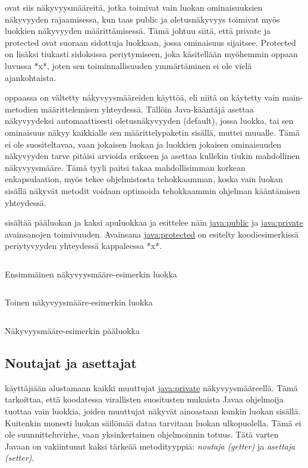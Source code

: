 \documentclass{tufte-book}
\newcommand{\eng}[1]{\textit{(#1)}}
\newcommand{\new}[1]{\textit{\gls{#1}}}
\newcommand{\neweng}[2]{\new{#1} \eng{#2}}
\newcommand{\java}[1]{\underline{\gls{java:#1}}}
\newcommand{\code}[3]{
\begin{listing}
    \inputminted{java}{OhjelmointiopasEsimerkit/src/#1/#2.java}
    \caption{#3}
    \label{Java-#1-#2}
\end{listing}
}
\begin{document}
 ovat siis näkyvyysmääreitä, jotka toimivat vain luokan
ominaisuuksien näkyvyyden rajaamisessa, kun taas public ja oletusnäkyvyys toimivat myös luokkien
näkyvyyden määrittämisessä. Tämä johtuu siitä, että private ja protected ovat suoraan sidottuja
luokkaan, jossa ominaisuus sijaitsee. Protected on lisäksi tiukasti sidoksissa periytymiseen, joka
käsitellään myöhemmin oppaan luvussa *x*, %
joten sen toiminnallisuuden ymmärtäminen ei ole vielä ajankohtaista.

 oppaassa on vältetty näkyvyysmääreiden käyttöä, eli niitä on käytetty
vain main-metodien määrittelemisen yhteydessä. Tällöin Java-kääntäjä asettaa näkyvyydeksi
automaattisesti oletusnäkyvyyden (default), jossa luokka, tai sen ominaisuus näkyy kaikkialle
sen määrittelypaketin sisällä, muttei muualle. Tämä ei ole suositeltavaa, vaan jokaisen luokan
ja luokkien jokaisen ominaisuuden näkyvyyden tarve pitäisi arvioida erikseen ja asettaa kullekin
tiukin mahdollinen näkyvyysmääre. Tämä tyyli paitsi takaa mahdollisimman korkean enkapsulaation,
myös tekee ohjelmistosta tehokkaamman, koska vain luokan sisällä näkyvät metodit voidaan optimoida
tehokkaammin ohjelman kääntämisen yhteydessä.

 sisältää pääluokan ja kaksi apuluokkaa ja esittelee näin
\java{public} ja \java{private} avainsanojen toimivuuden. Avainsana \java{protected} on esitelty
koodiesimerkissä periytyvyyden yhteydessä kappaleessa *x*. %

\code{week2}{AccessModifierExampleFirstChild}{Ensimmäinen näkyvyysmääre-esimerkin luokka}
\code{week2}{AccessModifierExampleSecondChild}{Toinen näkyvyysmääre-esimerkin luokka}
\code{week2}{AccessModifierExampleMain}{Näkyvyysmääre-esimerkin pääluokka}

\subsection{Noutajat ja asettajat}
\label{get set}

 käyttäjiään alustamaan kaikki muuttujat \java{private} näkyvyysmääreellä.
Tämä tarkoittaa, että koodatessa virallisten suositusten mukaista Javaa ohjelmoija tuottaa vain
luokkia, joiden muuttujat näkyvät ainoastaan kunkin luokan sisällä. Kuitenkin monesti luokan
säilömää dataa tarvitaan luokan ulkopuolella. Tämä ei ole suunnitteluvirhe, vaan yksinkertainen
ohjelmoinnin totuus. Tätä varten Javaan on vakiintunut kaksi tärkeää metodityyppiä:
\neweng{noutaja}{getter} ja \neweng{asettaja}{setter}.
\end{document}
